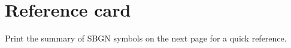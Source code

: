 \chapter{Reference card}
\label{chap:refcard}
Print the summary of SBGN symbols on the next page for a quick reference.

\noindent{}
